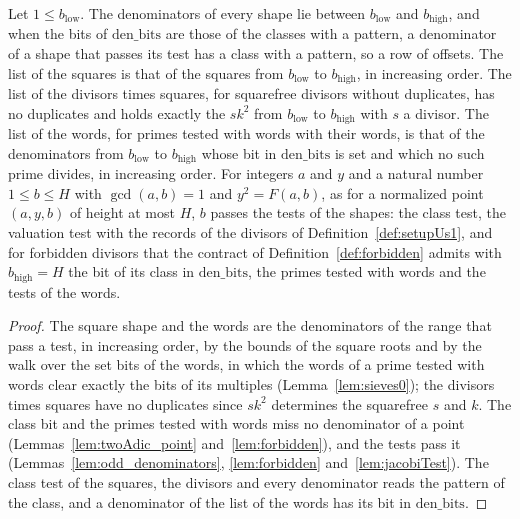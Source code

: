 \begin{lemma}\label{lem:shape_dens}
  \leanok
  Let $1 \le b_{\mathrm{low}}$. The denominators of every shape lie between $b_{\mathrm{low}}$ and
  $b_{\mathrm{high}}$, and when the bits of $\mathrm{den\_bits}$ are those of the classes with a
  pattern, a denominator of a shape that passes its test has a class with a pattern, so a row of
  offsets. The list of the squares is that of the squares from $b_{\mathrm{low}}$ to
  $b_{\mathrm{high}}$, in increasing order. The list of the divisors times squares, for squarefree
  divisors without duplicates, has no duplicates and holds exactly the $s k^2$ from
  $b_{\mathrm{low}}$ to $b_{\mathrm{high}}$ with $s$ a divisor. The list of the words, for primes
  tested with words with their words, is that of the denominators from $b_{\mathrm{low}}$ to
  $b_{\mathrm{high}}$ whose bit in $\mathrm{den\_bits}$ is set and which no such prime divides, in
  increasing order. For integers $a$ and $y$ and a natural number $1 \le b \le H$ with
  $\gcd(a, b) = 1$ and $y^2 = F(a, b)$, as for a normalized point $(a, y, b)$ of height at most $H$,
  $b$ passes the tests of the shapes: the class test, the valuation test with the records of the
  divisors of Definition~\ref{def:setupUs1}, and for forbidden divisors that the contract of
  Definition~\ref{def:forbidden} admits with $b_{\mathrm{high}} = H$ the bit of its class in
  $\mathrm{den\_bits}$, the primes tested with words and the tests of the words.
\end{lemma}

\begin{proof}
  \leanok
  The square shape and the words are the denominators of the range that pass a test, in increasing
  order, by the bounds of the square roots and by the walk over the set bits of the words, in which
  the words of a prime tested with words clear exactly the bits of its multiples
  (Lemma~\ref{lem:sieves0}); the divisors times squares have no duplicates since $s k^2$ determines
  the squarefree $s$ and $k$. The class bit and the primes tested with words miss no denominator of
  a point (Lemmas~\ref{lem:twoAdic_point} and~\ref{lem:forbidden}), and the tests pass it
  (Lemmas~\ref{lem:odd_denominators}, \ref{lem:forbidden} and~\ref{lem:jacobiTest}). The class test
  of the squares, the divisors and every denominator reads the pattern of the class, and a
  denominator of the list of the words has its bit in $\mathrm{den\_bits}$.
\end{proof}

